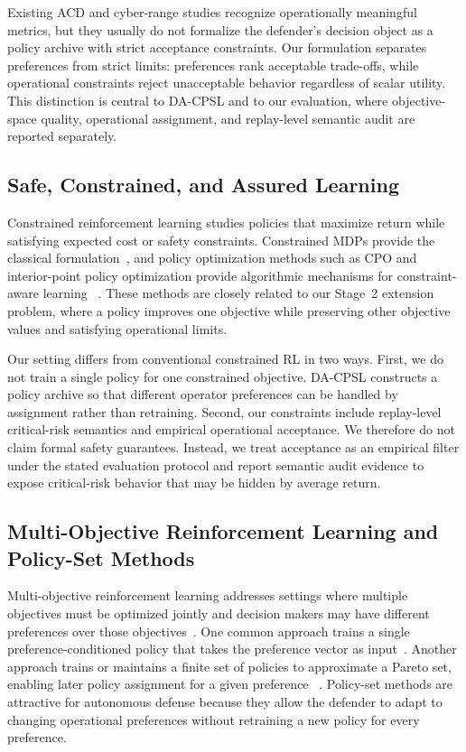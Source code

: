 \documentclass[sigconf,review,anonymous]{acmart}
\begin{document}
Existing ACD and cyber-range studies recognize operationally meaningful
metrics, but they usually do not formalize the defender's decision object
as a policy archive with strict acceptance constraints. Our formulation
separates preferences from strict limits: preferences rank acceptable
trade-offs, while operational constraints reject unacceptable behavior
regardless of scalar utility. This distinction is central to DA-CPSL and
to our evaluation, where objective-space quality, operational
assignment, and replay-level semantic audit are reported separately.

\subsection{Safe, Constrained, and Assured Learning}

Constrained reinforcement learning studies policies that maximize return
while satisfying expected cost or safety constraints. Constrained MDPs
provide the classical formulation~\cite{altman2021cmdp,dutta2021constraints}, and policy
optimization methods such as CPO and interior-point policy optimization
provide algorithmic mechanisms for constraint-aware learning
~\cite{schulman2015trpo,achiam2017cpo,liu2020ipo,tessler2018rcpo,xu2021crpo,paternain2019duality}. These methods are closely related to
our Stage~2 extension problem, where a policy improves one objective
while preserving other objective values and satisfying operational
limits.

Our setting differs from conventional constrained RL in two ways. First,
we do not train a single policy for one constrained objective. DA-CPSL
constructs a policy archive so that different operator preferences can be
handled by assignment rather than retraining. Second, our constraints
include replay-level critical-risk semantics and empirical operational
acceptance. We therefore do not claim formal safety guarantees. Instead,
we treat acceptance as an empirical filter under the stated evaluation
protocol and report semantic audit evidence to expose critical-risk
behavior that may be hidden by average return.

\subsection{Multi-Objective Reinforcement Learning and Policy-Set Methods}

Multi-objective reinforcement learning addresses settings where multiple
objectives must be optimized jointly and decision makers may have
different preferences over those objectives~\cite{roijers2013survey,hayes2022practical,parisi2016pareto,lu2023morl}.
One common approach trains a single preference-conditioned policy that
takes the preference vector as input~\cite{yang2019generalized,basaklar2022pdmorl}. Another
approach trains or maintains a finite set of policies to approximate a
Pareto set, enabling later policy assignment for a given preference
~\cite{vanmoffaert2014sets,xu2020prediction,alegre2022optimistic,alegre2023gpi,felten2024morld,ropke2024divide,zahavy2021policies}.
Policy-set methods are attractive for autonomous defense because they
allow the defender to adapt to changing operational preferences without
retraining a new policy for every preference.
\end{document}
